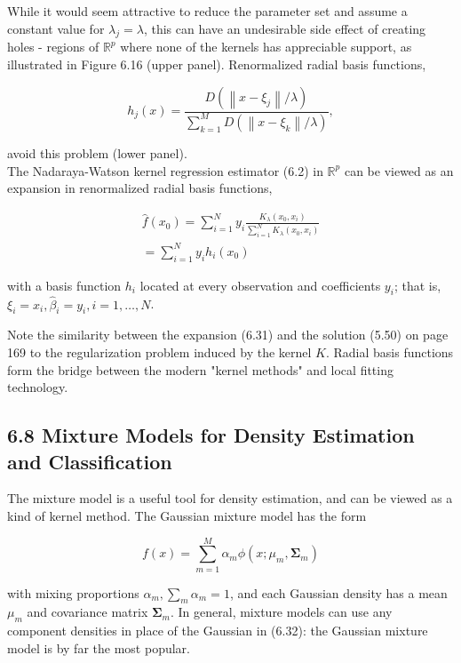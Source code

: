 \documentclass[10pt]{article}
\begin{document}
While it would seem attractive to reduce the parameter set and assume a constant value for $\lambda_{j}=\lambda$, this can have an undesirable side effect of creating holes - regions of $\mathbb{R}^{p}$ where none of the kernels has appreciable support, as illustrated in Figure 6.16 (upper panel). Renormalized radial basis functions,


\begin{equation*}
h_{j}(x)=\frac{D\left(\left\|x-\xi_{j}\right\| / \lambda\right)}{\sum_{k=1}^{M} D\left(\left\|x-\xi_{k}\right\| / \lambda\right)}, \tag{6.30}
\end{equation*}


avoid this problem (lower panel).\\
The Nadaraya-Watson kernel regression estimator (6.2) in $\mathbb{R}^{p}$ can be viewed as an expansion in renormalized radial basis functions,


\begin{gather*}
\hat{f}\left(x_{0}\right)=\sum_{i=1}^{N} y_{i} \frac{K_{\lambda}\left(x_{0}, x_{i}\right)}{\sum_{i=1}^{N} K_{\lambda}\left(x_{0}, x_{i}\right)} \\
=\sum_{i=1}^{N} y_{i} h_{i}\left(x_{0}\right) \tag{6.31}
\end{gather*}


with a basis function $h_{i}$ located at every observation and coefficients $y_{i}$; that is, $\xi_{i}=x_{i}, \hat{\beta}_{i}=y_{i}, i=1, \ldots, N$.

Note the similarity between the expansion (6.31) and the solution (5.50) on page 169 to the regularization problem induced by the kernel $K$. Radial basis functions form the bridge between the modern "kernel methods" and local fitting technology.

\subsection*{6.8 Mixture Models for Density Estimation and Classification}
The mixture model is a useful tool for density estimation, and can be viewed as a kind of kernel method. The Gaussian mixture model has the form


\begin{equation*}
f(x)=\sum_{m=1}^{M} \alpha_{m} \phi\left(x ; \mu_{m}, \boldsymbol{\Sigma}_{m}\right) \tag{6.32}
\end{equation*}


with mixing proportions $\alpha_{m}, \sum_{m} \alpha_{m}=1$, and each Gaussian density has a mean $\mu_{m}$ and covariance matrix $\boldsymbol{\Sigma}_{m}$. In general, mixture models can use any component densities in place of the Gaussian in (6.32): the Gaussian mixture model is by far the most popular.
\end{document}
